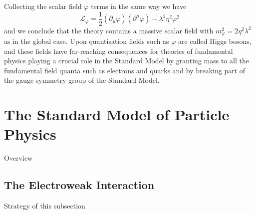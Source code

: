 Collecting the scalar field $\varphi$ terms in the same way we have 
\begin{equation}
    \label{eq:theory:abelian_scalar_SSB_L}
    \mathcal{L}_{\varphi} = \frac{1}{2}(\partial_{\mu}\varphi)(\partial^{\mu}\varphi) - \lambda^{2}\eta^{2}\varphi^{2}%
\end{equation}
and we conclude that the theory contains a massive scalar field with $m_{\varphi}^{2} = 2\eta^{2}\lambda^{2}$ as in the global case. Upon quantisation fields such as $\varphi$ are called Higgs bosons, and these fields have far-reaching consequences for theories of fundamental physics playing a crucial role in the Standard Model by granting mass to all the fundamental field quanta such as electrons and quarks and by breaking part of the gauge symmetry group of the Standard Model. 










\section{The Standard Model of Particle Physics}
Overview
\subsection{The Electroweak Interaction}
Strategy of this subsection

